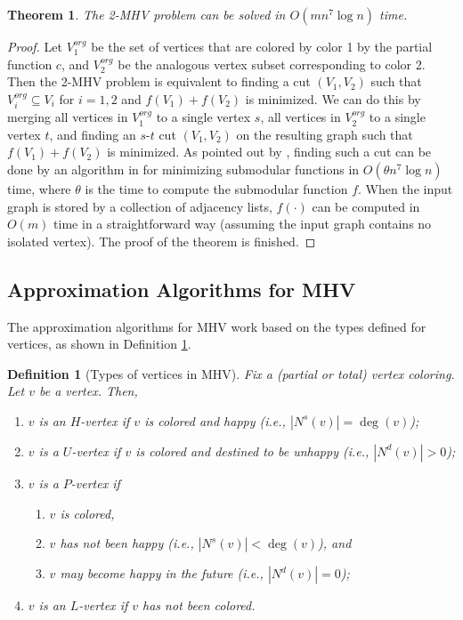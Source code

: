 \documentclass[11pt]{article}
\newtheorem{theorem}{Theorem}[section]
\newtheorem{definition}{Definition}[section]
\newcommand{\qed}{\vrule height4pt width4pt depth2pt}
\begin{document}
\begin{theorem}
The 2-MHV problem can be solved in $O(mn^7\log n)$ time.
\end{theorem}
\begin{proof}
Let $V_1^{org}$ be the set of vertices
that are colored by color 1 by the partial function $c$, and $V_2^{org}$
be the analogous vertex subset corresponding to color 2.
Then the 2-MHV problem is equivalent to finding a cut $(V_1, V_2)$
such that $V_i^{org} \subseteq V_i$ for $i=1, 2$ and $f(V_1) + f(V_2)$
is minimized. We can do this by merging all vertices in $V_1^{org}$ to
a single vertex $s$, all vertices in $V_2^{org}$ to a single vertex $t$,
and finding an $s$-$t$ cut $(V_1, V_2)$ on the resulting graph such that
$f(V_1) + f(V_2)$ is minimized.
As pointed out by \cite[Lemma 3]{ZNI05}, finding such a cut can be done
by an algorithm in \cite{IFF01} for minimizing submodular functions
in  $O(\theta n^7 \log n)$ time, where $\theta$ is the time to compute
the submodular function $f$.
When the input graph is stored by a collection of adjacency lists,
$f(\cdot)$ can be computed in $O(m)$ time in a straightforward way
(assuming the input graph contains no isolated vertex).
The proof of the theorem is finished.
\qed
\end{proof}




\subsection{Approximation Algorithms for MHV}
\label{subsec - Approxalgs for MHV}
The approximation algorithms for MHV work based on the types defined for
vertices, as shown in Definition \ref{def - types of vertices in MHV}.

\begin{definition}[Types of vertices in MHV]
\label{def - types of vertices in MHV}
Fix a (partial or total) vertex coloring. Let $v$ be a vertex. Then,
\begin{enumerate}
\item $v$ is an {\em $H$-vertex} if $v$ is colored and happy (i.e., $|N^s(v)| = \deg(v)$);
\item $v$ is a {\em $U$-vertex} if $v$ is colored and destined to be unhappy
(i.e., $|N^d(v)| > 0$);
\item $v$ is a {\em $P$-vertex} if
\begin{enumerate}
    \item $v$ is colored,
    \item $v$ has not been happy (i.e., $|N^s(v)| < \deg(v)$), and
    \item $v$ may become happy in the future (i.e., $|N^d(v)| = 0$);
\end{enumerate}
\item $v$ is an {\em $L$-vertex} if $v$ has not been colored.
\end{enumerate}
\end{definition}
\end{document}
